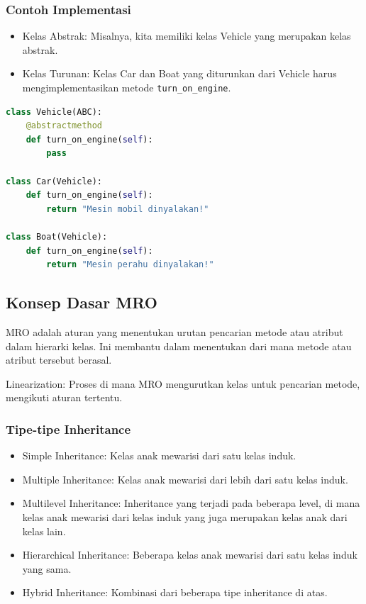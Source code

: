 \documentclass{article}
\begin{document}
\subsubsection{Contoh Implementasi}
\begin{itemize}
    \item Kelas Abstrak: Misalnya, kita memiliki kelas Vehicle yang merupakan kelas abstrak.
    \item Kelas Turunan: Kelas Car dan Boat yang diturunkan dari Vehicle harus mengimplementasikan metode \verb|turn_on_engine|.
\end{itemize}

\begin{lstlisting}[language=Python, caption={}, captionpos=b]
class Vehicle(ABC):
    @abstractmethod
    def turn_on_engine(self):
        pass

class Car(Vehicle):
    def turn_on_engine(self):
        return "Mesin mobil dinyalakan!"

class Boat(Vehicle):
    def turn_on_engine(self):
        return "Mesin perahu dinyalakan!"
\end{lstlisting}

\subsection{Konsep Dasar MRO}
MRO adalah aturan yang menentukan urutan pencarian metode atau atribut dalam hierarki kelas. Ini membantu dalam menentukan dari mana metode atau atribut tersebut berasal.

Linearization: Proses di mana MRO mengurutkan kelas untuk pencarian metode, mengikuti aturan tertentu.

\subsubsection{Tipe-tipe Inheritance}
\begin{itemize}
    \item Simple Inheritance: Kelas anak mewarisi dari satu kelas induk.
    \item Multiple Inheritance: Kelas anak mewarisi dari lebih dari satu kelas induk.
    \item Multilevel Inheritance: Inheritance yang terjadi pada beberapa level, di mana kelas anak mewarisi dari kelas induk yang juga merupakan kelas anak dari kelas lain.
    \item Hierarchical Inheritance: Beberapa kelas anak mewarisi dari satu kelas induk yang sama.
    \item Hybrid Inheritance: Kombinasi dari beberapa tipe inheritance di atas.
\end{itemize}
\end{document}
